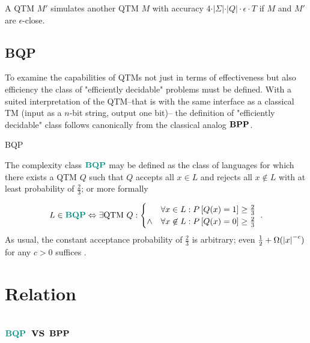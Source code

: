 \begin{corollary}
\label{col:etod}
A \ac{QTM} $M'$ simulates another \ac{QTM} $M$ with accuracy $4\cdot\vert\Sigma\vert\cdot\vert Q\vert\cdot\epsilon\cdot T$ if $M$ and $M'$ are $\epsilon$-close.
\end{corollary}



\subsection{\acl{BQP}}

To examine the capabilities of \acp{QTM} not just in terms of effectiveness but also efficiency the class of "efficiently decidable" problems must be defined.
With a suited interpretation of the \ac{QTM}--that is with the same interface as a classical \ac{TM} (input as a $n$-bit string, output one bit)-- the definition of "efficiently decidable" class follows canonically from the classical analog $\mathbf{BPP}$.

\begin{definition}
\acf{BQP}

The complexity class $\BQP$ may be defined as the class of languages for which there exists a \ac{QTM} $Q$ such that $Q$ accepts all $x\in L$ and rejects all $x\not\in L$ with at least probability of $\frac{2}{3}$; or more formally

\begin{equation*}
    L\in\BQP
    \Leftrightarrow
    \exists\mathrm{QTM}\ Q:
    \begin{cases}
    & \forall x\in L:\Pr{Q(x)=1}\geq\frac{2}{3}
    \\
    \wedge
    & \forall x\not\in L:\Pr{Q(x)=0}\geq\frac{2}{3}
    \end{cases}
    \ .
\end{equation*}
As usual, the constant acceptance probability of $\frac{2}{3}$ is arbitrary; even $\frac{1}{2}+\Omega(\left\vert x\right\vert^{-c})$ for any $c>0$ suffices \cite{arora_barak_2016}.

\end{definition}

\section{Relation}
\label{Relations}

\subsection{$\BQP$ vs $\mathbf{BPP}$}

